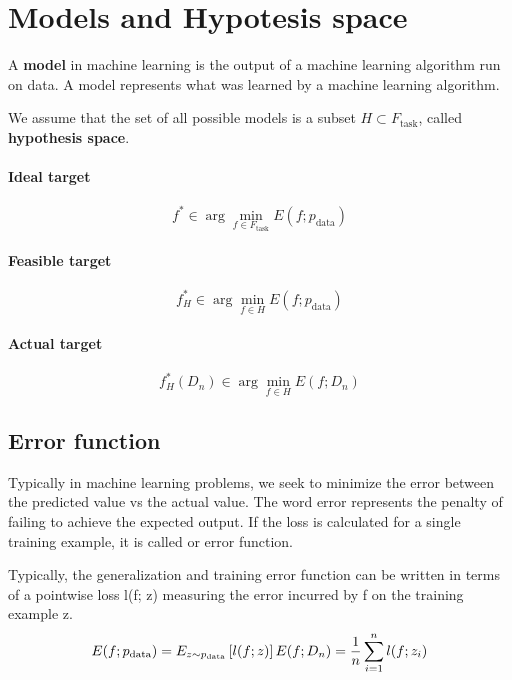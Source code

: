 \documentclass[a4paper,6pt,twocolumn,fleqn]{article}
\begin{document}

\section{Models and Hypotesis space}
A \textbf{model} in machine learning is the output of a machine learning algorithm run on data. A model represents what was learned by a machine learning algorithm.

We assume that the set of all possible models is a subset \(H \subset F_\text{task}\), called \textbf{hypothesis space}.
\paragraph{Ideal target}
\begin{equation}
    f^* \in \arg \min_{f \in F_\text{task}} E(f; p_\text{data})
\end{equation}
\paragraph{Feasible target}
\begin{equation}
    f_H^* \in \arg \min_{f \in H} E(f; p_\text{data})
\end{equation}
\paragraph{Actual target}
\begin{equation}
    f_H^*(D_n) \in \arg \min_{f \in H} E(f; D_n)
\end{equation}
\subsection{Error function}
Typically in machine learning problems, we seek to minimize the error between the predicted value vs the actual value. The word error represents the penalty of failing to achieve the expected output. If the loss is calculated for a single training example, it is called or error function.

Typically, the generalization and training error function can be written in terms of a pointwise loss l(f; z) measuring the error incurred by f on the training example z.
\begin{equation}
    E(f; p_\text{data}) = E_{z \sim p_\text{data}} \left[l(f;z)\right]\\
    E(f;D_n) = \frac 1 n \sum_{i=1}^n l (f;z_i)
\end{equation}
\end{document}
